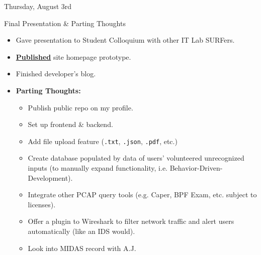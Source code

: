 \documentclass[11pt]{article}
\begin{document}
\normalsize\begin{indigobox}{Thursday, August 3rd\vspace{-2.2em}\begin{flushright}Final Presentation \& Parting Thoughts \end{flushright}}
    \begin{itemize}
        \item Gave presentation to Student Colloquium with other IT Lab SURFers.
        \vspace{-0.5em}
        \item \href{https://github.com/usnistgov/ngpac/commit/95b623c232e5fefc829575f7ab52c80e0752827e}{\textbf{Published}} site homepage prototype.
        \vspace{-0.5em}
        \item Finished developer's blog.
        \vspace{-0.5em}
        \item \textbf{Parting Thoughts:}
            \begin{itemize}
                \vspace{-0.25em}
                \item Publish public repo on my profile.
                \item Set up frontend \& backend.
                \item Add file upload feature (\texttt{.txt}, \texttt{.json}, \texttt{.pdf}, etc.)
                \item Create database populated by data of users' volunteered unrecognized inputs (to manually expand functionality, i.e. Behavior-Driven-Development).
                \item Integrate other PCAP query tools (e.g. Caper, BPF Exam, etc. subject to licenses).
                \item Offer a plugin to Wireshark to filter network traffic and alert users automatically (like an IDS would).
                \item Look into MIDAS record with A.J.
            \end{itemize}
    \end{itemize}
\end{indigobox}
\end{document}

